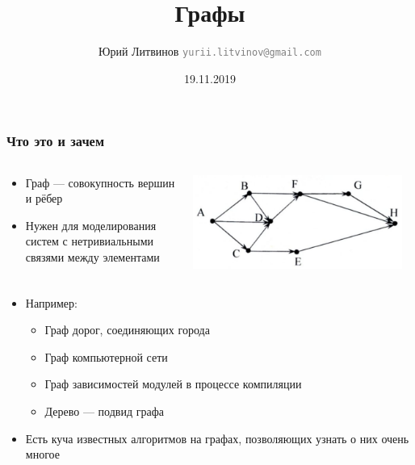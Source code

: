 \documentclass[xetex,mathserif,serif]{beamer}
\title{Графы}
\author[Юрий Литвинов]{Юрий Литвинов \newline \textcolor{gray}{\small\texttt{yurii.litvinov@gmail.com}}}
\date{19.11.2019}
\begin{document}
	
	\frame{\titlepage}

	\begin{frame}
		\frametitle{Что это и зачем}
		\begin{columns}
			\begin{column}{0.4\textwidth}
				\begin{itemize}
					\item Граф --- совокупность вершин и рёбер
					\item Нужен для моделирования систем с нетривиальными связями между элементами
				\end{itemize}
			\end{column}
			\begin{column}{0.6\textwidth}
				\begin{center}
					\includegraphics[width=0.95\textwidth]{graph.png}
				\end{center}
			\end{column}
		\end{columns}
		\begin{itemize}
			\item Например:
			\begin{itemize}
				\item Граф дорог, соединяющих города
				\item Граф компьютерной сети
				\item Граф зависимостей модулей в процессе компиляции
				\item Дерево --- подвид графа
			\end{itemize}
			\item Есть куча известных алгоритмов на графах, позволяющих узнать о них очень многое
		\end{itemize}
	\end{frame}
\end{document}
